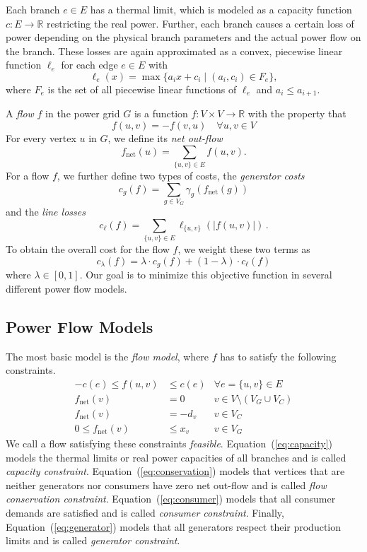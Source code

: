 \documentclass{article}[11pt,a4paper]
\newcommand{\net}{\ensuremath{\mathrm{net}}}
\begin{document}
Each branch $e \in E$ has a thermal limit, which is modeled as a capacity function $c\colon E\to\mathbb{R}$ restricting the real power. 
Further, each branch causes a certain loss of power depending on the physical branch parameters and the actual power flow on the branch. 
These losses are again approximated as a convex, piecewise linear function $\ell_{e}$ for each edge $e \in E$ with
\begin{equation}
	\label{eq:losscostfunction}	
	\ell_{e}(x) = \max\{a_i x + c_i \mid(a_i, c_i)\in F_{e}\},
\end{equation}
where $F_e$ is the set of all piecewise linear functions of $\ell_e$ and $a_i\leq a_{i+1}$.


A \emph{flow} $f$ in the power grid $G$ is a function $f \colon V \times V \to
\mathbb{R}$ with the property that 
\begin{equation}
	f(u,v) = -f(v,u) \quad \forall u,v \in V
\end{equation}
For every vertex $u$ in $G$, we define its \emph{net
  out-flow} \[f_\net(u) = \sum_{\{u,v\} \in E} f(u,v).\] 
For a flow $f$, we further define two types of costs, the \emph{generator
  costs} \[c_g(f) = \sum_{g \in V_G} \gamma_g(f_\net(g))\] and the
\emph{line losses} \[c_\ell(f) = \sum_{\{u,v\} \in E} \ell_{\{u,v\}}(|f(u,v)|)\,.\] To
obtain the overall cost for the flow $f$, we weight these two terms as
\begin{equation}
c_\lambda(f) = \lambda \cdot c_g(f) + (1-\lambda) \cdot c_\ell(f)\label{eq:objective}
\end{equation}
where $\lambda\in [0,1]$.  Our goal is to minimize this objective
function in several different power flow models.
\subsection{Power Flow Models}
\label{sec:power-flow-models}
The most basic model is the \emph{flow model}, where $f$ has to
satisfy the following constraints.
\begin{align}
 -c(e) \le f(u,v) & \le c(e)  &  \forall e=\{u,v\} \in E\label{eq:capacity}\\
f_\net(v) & =  0 & v \in V\setminus (V_G \cup V_C)\label{eq:conservation}\\
f_\net(v) & =   -d_v & v \in V_C\label{eq:consumer}\\
0 \le f_\net(v) & \le x_v &  v \in V_G\label{eq:generator} 
\end{align}
We call a flow satisfying these constraints \emph{feasible}.
Equation~(\ref{eq:capacity}) models the thermal limits or real power capacities of all branches and is called \emph{capacity constraint}. 
Equation~(\ref{eq:conservation}) models that vertices that are neither generators nor consumers have zero net out-flow and is called \emph{flow conservation constraint}. 
Equation~(\ref{eq:consumer}) models that all consumer demands are satisfied and is called \emph{consumer constraint}.
Finally, Equation~(\ref{eq:generator}) models that all generators respect their production limits and is called \emph{generator constraint}.
\end{document}
